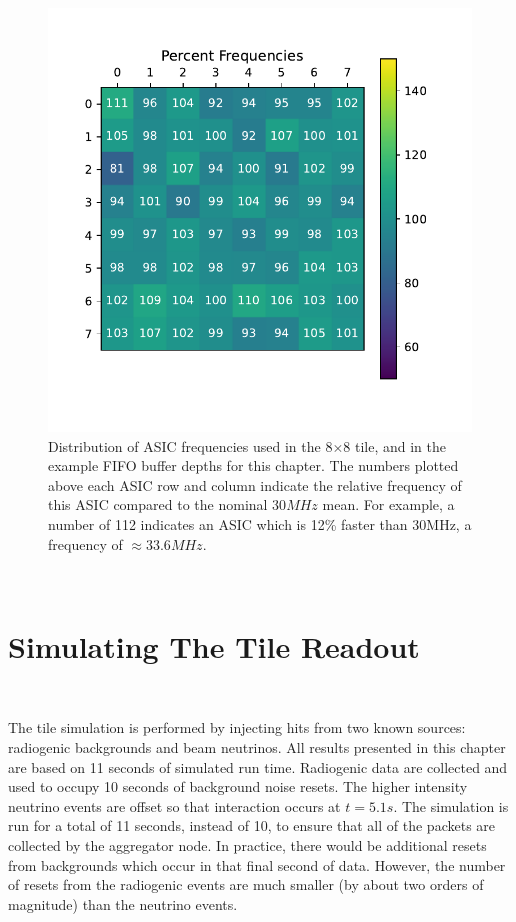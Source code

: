 \begin{figure}[]
\centering
\includegraphics[width=\textwidth]{images/asic_frequency.pdf}
\caption{Distribution of ASIC frequencies used in the 8$\times$8 tile, and in the example FIFO buffer depths for this chapter.
The numbers plotted above each ASIC row and column indicate the relative frequency of this ASIC compared to the nominal 30$\unit{MHz}$ mean.
For example, a number of 112 indicates an ASIC which is 12\% faster than 30MHz, a frequency of $\approx 33.6 MHz$.}
\end{figure}~\label{fig:asic_frequency_example}

\section{Simulating The Tile Readout}~\label{sec:simulating_tile}

The tile simulation is performed by injecting hits from two known sources: radiogenic backgrounds and beam neutrinos.
All results presented in this chapter are based on 11 seconds of simulated run time.
Radiogenic data are collected and used to occupy 10 seconds of background noise resets.
The higher intensity neutrino events are offset so that interaction occurs at $t = 5.1 s$.
The simulation is run for a total of 11 seconds, instead of 10, to ensure that all of the packets are collected by the aggregator node.
In practice, there would be additional resets from backgrounds which occur in that final second of data.
However, the number of resets from the radiogenic events are much smaller (by about two orders of magnitude) than the neutrino events.

